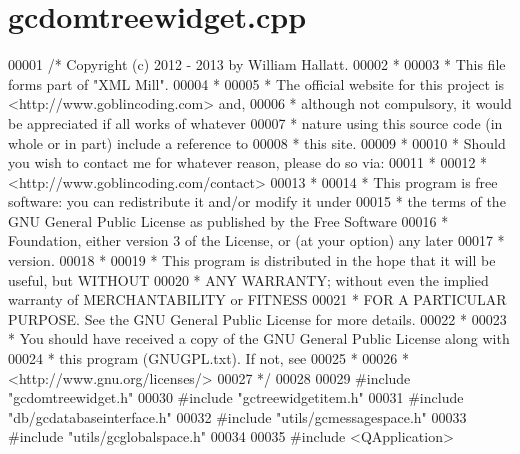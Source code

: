 \hypertarget{gcdomtreewidget_8cpp_source}{\section{gcdomtreewidget.\-cpp}
}

\begin{DoxyCode}
00001 \textcolor{comment}{/* Copyright (c) 2012 - 2013 by William Hallatt.}
00002 \textcolor{comment}{ *}
00003 \textcolor{comment}{ * This file forms part of "XML Mill".}
00004 \textcolor{comment}{ *}
00005 \textcolor{comment}{ * The official website for this project is <http://www.goblincoding.com> and,}
00006 \textcolor{comment}{ * although not compulsory, it would be appreciated if all works of whatever}
00007 \textcolor{comment}{ * nature using this source code (in whole or in part) include a reference to}
00008 \textcolor{comment}{ * this site.}
00009 \textcolor{comment}{ *}
00010 \textcolor{comment}{ * Should you wish to contact me for whatever reason, please do so via:}
00011 \textcolor{comment}{ *}
00012 \textcolor{comment}{ *                 <http://www.goblincoding.com/contact>}
00013 \textcolor{comment}{ *}
00014 \textcolor{comment}{ * This program is free software: you can redistribute it and/or modify it
       under}
00015 \textcolor{comment}{ * the terms of the GNU General Public License as published by the Free
       Software}
00016 \textcolor{comment}{ * Foundation, either version 3 of the License, or (at your option) any later}
00017 \textcolor{comment}{ * version.}
00018 \textcolor{comment}{ *}
00019 \textcolor{comment}{ * This program is distributed in the hope that it will be useful, but WITHOUT}
00020 \textcolor{comment}{ * ANY WARRANTY; without even the implied warranty of MERCHANTABILITY or
       FITNESS}
00021 \textcolor{comment}{ * FOR A PARTICULAR PURPOSE.  See the GNU General Public License for more
       details.}
00022 \textcolor{comment}{ *}
00023 \textcolor{comment}{ * You should have received a copy of the GNU General Public License along with}
00024 \textcolor{comment}{ * this program (GNUGPL.txt).  If not, see}
00025 \textcolor{comment}{ *}
00026 \textcolor{comment}{ *                    <http://www.gnu.org/licenses/>}
00027 \textcolor{comment}{ */}
00028 
00029 \textcolor{preprocessor}{#include "gcdomtreewidget.h"}
00030 \textcolor{preprocessor}{#include "gctreewidgetitem.h"}
00031 \textcolor{preprocessor}{#include "db/gcdatabaseinterface.h"}
00032 \textcolor{preprocessor}{#include "utils/gcmessagespace.h"}
00033 \textcolor{preprocessor}{#include "utils/gcglobalspace.h"}
00034 
00035 \textcolor{preprocessor}{#include <QApplication>}

\end{DoxyCode}

